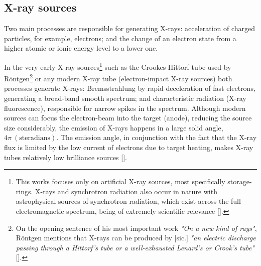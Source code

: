 \begin{refsection}
\subsection{X-ray sources}\label{sec:sources}
Two main processes are responsible for generating X-rays: acceleration of charged particles, for example, electrons; and the change of an electron state from a higher atomic or ionic energy level to a lower one.

In the very early X-ray sources\footnote{This works focuses only on artificial X-ray sources, most specifically storage-rings. X-rays and synchrotron radiation also occur in nature with astrophysical sources of synchrotron radiation, which exist across the full electromagnetic spectrum, being of extremely scientific relevance [\cite{Ginzburg1965,Wielebinski2006}].} such as the Crookes-Hittorf tube used by R\"{o}ntgen\footnote{On the opening sentence of his most important work \textit{"On a new kind of rays"}, R\"{o}ntgen mentions that X-rays can be produced by [sic.] \textit{"an electric discharge passing through a Hittorf's tube or a well-exhausted Lenard's or Crook's tube"} [\cite{Roentgen1896}].} or any modern X-ray tube (electron-impact X-ray sources) both processes generate X-rays: Bremsstrahlung by rapid deceleration of fast electrons, generating a broad-band smooth spectrum; and characteristic radiation (X-ray fluorescence), responsible for narrow spikes in the spectrum. Although modern sources can focus the electron-beam into the target (anode), reducing the source size considerably, the emission of X-rays happens in a large solid angle, $4\pi~(\mathrm{steradians})$. The emission angle, in conjunction with the fact that the X-ray flux is limited by the low current of electrons  due to target heating, makes X-ray tubes relatively low brilliance sources [\cite[\textit{§1.6} \& \textit{§2}]{Michette1993}].


\end{refsection}

